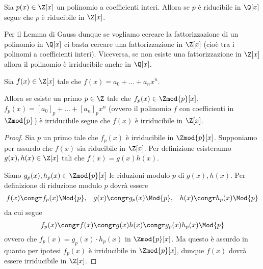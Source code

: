 \begin{theorem}
     \label{lemma_di_Gauss}
    Sia $p(x) \in \Z[x]$ un polinomio a coefficienti interi. Allora se $p$ è riducibile in $\Q[x]$ segue che $p$ è riducibile in $\Z[x]$.
\end{theorem}

Per il Lemma di Gauss dunque se vogliamo cercare la fattorizzazione di un polinomio in $\Q[x]$ ci basta cercare una fattorizzazione in $\Z[x]$ (cioè tra i polinomi a coefficienti interi). Viceversa, se non esiste una fattorizzazione in $\Z[x]$ allora il polinomio è irriducibile anche in $\Q[x]$.
\begin{proposition}
     \label{criterio_riduzione}
    Sia $f(x) \in \Z[x]$ tale che $f(x) = a_0 + \dots + a_nx^n$. 
    
    Allora se esiste un primo $p \in \Z$ tale che $f_p(x) \in \Zmod{p}[x]$, $f_p(x) = [a_0]_p + \dots + [a_n]_px^n $ (ovvero il polinomio $f$ con coefficienti in $\Zmod{p}$) è irriducibile segue che $f(x)$ è irriducibile in $\Z[x]$.
\end{proposition}
\begin{proof}
    Sia $p$ un primo tale che $f_p(x)$ è irriducibile in $\Zmod{p}[x]$. Supponiamo per assurdo che $f(x)$ sia riducibile in $\Z[x]$. Per definizione esisteranno $g(x), h(x) \in \Z[x]$ tali che $f(x) = g(x)h(x)$.

    Siano $g_p(x), h_p(x) \in \Zmod{p}[x]$ le riduzioni modulo $p$ di $g(x), h(x)$. Per definizione di riduzione modulo $p$ dovrà essere \begin{align*}
        f(x) \congr f_p(x) \Mod{p}, &&g(x) \congr g_p(x) \Mod{p}, &&h(x) \congr h_p(x) \Mod{p}
    \end{align*} da cui segue \[
        f_p(x) \congr f(x) \congr g(x)h(x) \congr g_p(x)h_p(x) \Mod{p}    
    \] ovvero che $f_p(x) = g_p(x) \cdot h_p(x)$ in $\Zmod{p}[x]$. Ma questo è assurdo in quanto per ipotesi $f_p(x)$ è irriducibile in $\Zmod{p}[x]$, dunque $f(x)$ dovrà essere irriducibile in $\Z[x]$.
\end{proof}

